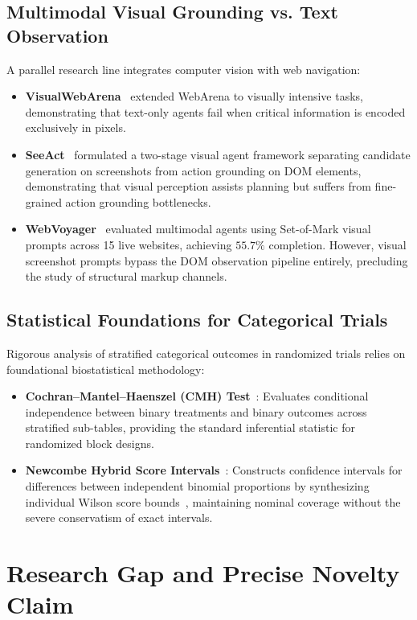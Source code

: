 \documentclass[11pt,a4paper]{article}
\begin{document}
\subsection{Multimodal Visual Grounding vs. Text Observation}
A parallel research line integrates computer vision with web navigation:
\begin{itemize}
    \item \textbf{VisualWebArena}~\cite{koh2024visualwebarena} extended WebArena to visually intensive tasks, demonstrating that text-only agents fail when critical information is encoded exclusively in pixels.
    \item \textbf{SeeAct}~\cite{zheng2024seeact} formulated a two-stage visual agent framework separating candidate generation on screenshots from action grounding on DOM elements, demonstrating that visual perception assists planning but suffers from fine-grained action grounding bottlenecks.
    \item \textbf{WebVoyager}~\cite{he2024webvoyager} evaluated multimodal agents using Set-of-Mark visual prompts across 15 live websites, achieving $55.7\%$ completion. However, visual screenshot prompts bypass the DOM observation pipeline entirely, precluding the study of structural markup channels.
\end{itemize}

\subsection{Statistical Foundations for Categorical Trials}
Rigorous analysis of stratified categorical outcomes in randomized trials relies on foundational biostatistical methodology:
\begin{itemize}
    \item \textbf{Cochran--Mantel--Haenszel (CMH) Test}~\cite{mantel1959statistical, agresti2002categorical}: Evaluates conditional independence between binary treatments and binary outcomes across stratified sub-tables, providing the standard inferential statistic for randomized block designs.
    \item \textbf{Newcombe Hybrid Score Intervals}~\cite{newcombe1998interval}: Constructs confidence intervals for differences between independent binomial proportions by synthesizing individual Wilson score bounds~\cite{wilson1927probable}, maintaining nominal coverage without the severe conservatism of exact intervals.
\end{itemize}

\section{Research Gap and Precise Novelty Claim}
\label{sec:gap}
\end{document}
